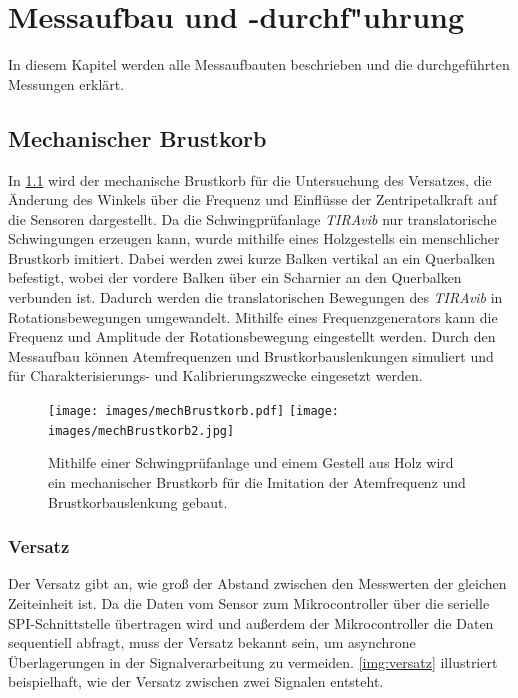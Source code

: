 
\lhead[\chaptername~\thechapter]{\rightmark}


\rhead[\leftmark]{}


\lfoot[\thepage]{}


\cfoot{}


\rfoot[]{\thepage}


\chapter{Messaufbau und -durchf"uhrung}
In diesem Kapitel werden alle Messaufbauten beschrieben und die durchgeführten Messungen erklärt. 

\section{Mechanischer Brustkorb}
In \ref{img:mech-bruskorb} wird der mechanische Brustkorb für die Untersuchung des Versatzes, die Änderung des Winkels über die Frequenz und Einflüsse der Zentripetalkraft auf die Sensoren dargestellt. Da die Schwingprüfanlage \textit{TIRAvib} nur translatorische Schwingungen erzeugen kann, wurde mithilfe eines Holzgestells ein menschlicher Brustkorb imitiert. Dabei werden zwei kurze Balken vertikal an ein Querbalken befestigt, wobei der vordere Balken über ein Scharnier an den Querbalken verbunden ist. Dadurch werden die translatorischen Bewegungen des \textit{TIRAvib} in Rotationsbewegungen umgewandelt. Mithilfe eines Frequenzgenerators kann die Frequenz und Amplitude der Rotationsbewegung eingestellt werden. Durch den Messaufbau können Atemfrequenzen und Brustkorbauslenkungen simuliert und für Charakterisierungs- und Kalibrierungszwecke eingesetzt werden.

\begin{figure}
	\centering
	\texttt{[image: images/mechBrustkorb.pdf]}
	\texttt{[image: images/mechBrustkorb2.jpg]}
	\caption[Mechanischer Brustkorb]{Mithilfe einer Schwingprüfanlage und einem Gestell aus Holz wird ein mechanischer Brustkorb für die Imitation der Atemfrequenz und Brustkorbauslenkung gebaut.}
	\label{img:mech-bruskorb}
\end{figure}

	\subsection{Versatz}
	Der Versatz gibt an, wie groß der Abstand zwischen den Messwerten der gleichen Zeiteinheit ist. Da die Daten vom Sensor zum Mikrocontroller über die serielle SPI-Schnittstelle übertragen wird und außerdem der Mikrocontroller die Daten sequentiell abfragt, muss der Versatz bekannt sein, um asynchrone Überlagerungen in der Signalverarbeitung zu vermeiden. \ref{img:versatz} illustriert beispielhaft, wie der Versatz zwischen zwei Signalen entsteht.
	
